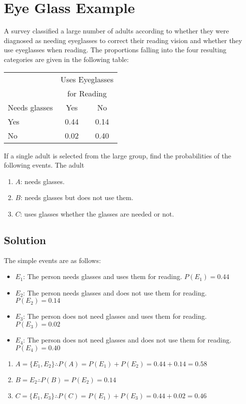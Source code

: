 \documentclass[11pt]{article}
\theoremstyle{definition}
\begin{document}
\section{Eye Glass Example}

A survey classified a large number of adults according to whether they were diagnosed as needing eyeglasses to correct their reading vision and whether they use eyeglasses when reading. The proportions falling into the four resulting categories are given in the following table:

\begin{table}[H]
	\centering
	\begin{tabular}{lcc}
		\hline
		& \multicolumn{2}{c}{Uses Eyeglasses} \\
		& \multicolumn{2}{c}{for Reading} \\\cmidrule{2-3}
		Needs glasses & Yes & No \\\hline
		Yes & 0.44 & 0.14 \\
		No & 0.02 & 0.40 \\\hline
	\end{tabular}
\end{table}

\noindent If a single adult is selected from the large group, find the probabilities of the following events. The adult

\begin{enumerate}
	\item $A$: needs glasses.
	\item $B$: needs glasses but does not use them.
	\item $C$: uses glasses whether the glasses are needed or not.
\end{enumerate}

\subsection{Solution}

The simple events are as follows:

\begin{itemize}
	\item $E_1$: The person needs glasses and uses them for reading. $P(E_1) = 0.44$
	\item $E_2$: The person needs glasses and does not use them for reading. $P(E_2) = 0.14$
	\item $E_3$: The person does not need glasses and uses them for reading. $P(E_3) = 0.02$
	\item $E_4$: The person does not need glasses and does not use them for  reading. $P(E_4) = 0.40$
\end{itemize}

\begin{enumerate}
	\item $A = \{E_1, E_2\} \therefore P(A) = P(E_1) + P(E_2) = 0.44 + 0.14 = 0.58$
	\item $B = E_2 \therefore P(B) = P(E_2) = 0.14$
	\item $C = \{E_1, E_3\} \therefore P(C) = P(E_1) + P(E_3) = 0.44 + 0.02 = 0.46$
\end{enumerate}
\end{document}
